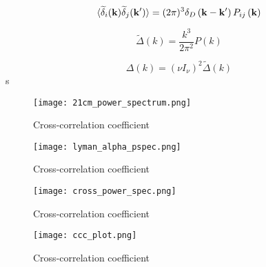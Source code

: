 \begin{equation}
\langle \widetilde{\delta}_i ({\bf k}) \widetilde{\delta}_j ({\bf k'}) \rangle = (2 \pi) ^3 \delta_D \left( {\bf k} - {\bf k'} \right) P_{ij} \left({\bf k} \right)
\end{equation}

\begin{equation}
    \widetilde{\Delta} \left( k \right) = \frac{k^3}{2 \pi ^2} P \left( k \right)
\end{equation}

\begin{equation}
    \Delta \left( k \right) = \left( \nu I_{\nu} \right)^2 \widetilde{\Delta} \left( k \right)
\end{equation}s

\begin{figure}[ht]
	\centering
	\texttt{[image: 21cm\_power\_spectrum.png]}
	\caption[21cm Power Spectrum]{Cross-correlation coefficient}
	\label{fig:21cm_ps}
\end{figure}

\begin{figure}[ht]
	\centering
	\texttt{[image: lyman\_alpha\_pspec.png]}
	\caption[Ly$\alpha$ Power Spectrum]{Cross-correlation coefficient}
	\label{fig:lya_ps}
\end{figure}

\begin{figure}[ht]
	\centering
	\texttt{[image: cross\_power\_spec.png]}
	\caption[Cross-Power Spectrum]{Cross-correlation coefficient}
	\label{fig:x_ps}
\end{figure}

\begin{figure}[ht]
	\centering
	\texttt{[image: ccc\_plot.png]}
	\caption[Cross-Correlation Coefficient]{Cross-correlation coefficient}
	\label{fig:ccc}
\end{figure}
